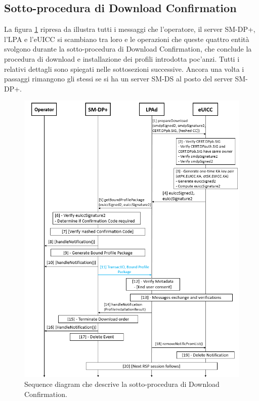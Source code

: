 \documentclass[10pt, oneside]{book}
\begin{document}
\subsection{Sotto-procedura di Download Confirmation}\label{sec:down-confirm}
La figura \ref{fig:download-confirmation} ripresa da \cite{GSMA-docs-new} illustra tutti i messaggi che l'operatore, il server SM-DP+, l'LPA e l'eUICC si scambiano tra loro e le operazioni che queste quattro entità svolgono durante la sotto-procedura di Download Confirmation, che conclude la procedura di download e installazione dei profili introdotta poc'anzi. Tutti i relativi dettagli \cite{GSMA-docs-new} sono spiegati nelle sottosezioni successive. Ancora una volta i passaggi rimangono gli stessi se si ha un server SM-DS al posto del server SM-DP+.
\begin{figure}
\includegraphics[width=\linewidth]{download-confirmation.png}
\caption{Sequence diagram che descrive la sotto-procedura di Download Confirmation.}
\label{fig:download-confirmation}
\end{figure}
\end{document}

